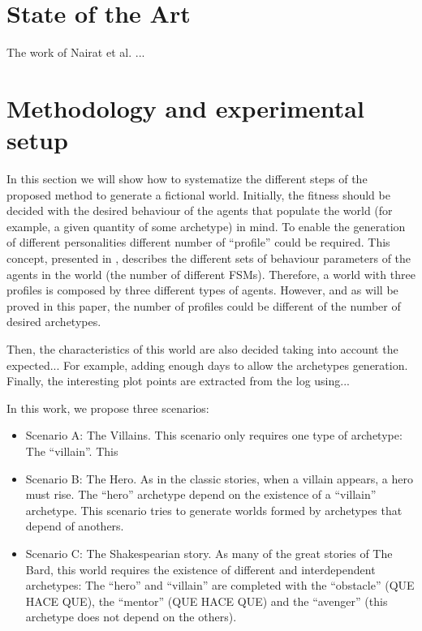 \documentclass[runningheads,a4paper]{llncs}
\begin{document}
\section{State of the Art}

The work of Nairat et al. \cite{nairat:evolution} ...

\section{Methodology and experimental setup} %
\label{sec:met}

In this section we will show how to systematize the different steps
of
the proposed method to generate a fictional world. Initially, the
fitness should be decided with the desired behaviour of the
agents that populate the world (for example, a given quantity of some
archetype) in mind. To enable the generation of different
personalities %
different number of ``profile'' could be required. This concept,
presented in \cite{}, describes the different sets of behaviour
parameters of the agents in the world (the number of different
FSMs). Therefore, a world with three profiles is composed by three different
types of agents. However, and as will be proved in this paper, the
number of profiles could be different of the number of desired
archetypes. %

Then, the characteristics of this world are also decided taking into account the expected... For example, adding enough days to allow the archetypes generation. Finally, the interesting plot points are extracted from the log using... %

In this work, we propose three scenarios:
\begin{itemize}
\item Scenario A: The Villains. This scenario only requires one type of archetype: The ``villain''. This %
\item Scenario B: The Hero. As in the classic stories, when a villain appears, a hero must rise. The ``hero'' archetype depend on the existence of a ``villain'' archetype. This scenario tries to generate worlds formed by archetypes that depend of anothers.
\item Scenario C: The Shakespearian story. As many of the great stories of The Bard, this world requires the existence of different and interdependent archetypes: The ``hero'' and ``villain'' are completed with the ``obstacle'' (QUE HACE QUE), the  ``mentor'' (QUE HACE QUE) and the ``avenger'' (this archetype does not depend on the others).

\end{itemize}
\end{document}
